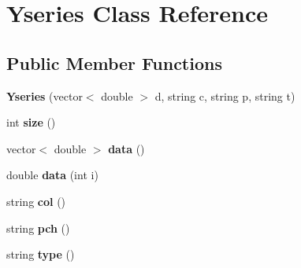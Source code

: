 \hypertarget{classYseries}{}\section{Yseries Class Reference}
\label{classYseries}
\subsection*{Public Member Functions}
\begin{DoxyCompactItemize}
\item 
\hypertarget{classYseries_a9be497f36c55fce41a55da4e01aa9572}{}{\bfseries Yseries} (vector$<$ double $>$ d, string c, string p, string t)\label{classYseries_a9be497f36c55fce41a55da4e01aa9572}

\item 
\hypertarget{classYseries_a5bc0a282eb4db0040de12409703fe586}{}int {\bfseries size} ()\label{classYseries_a5bc0a282eb4db0040de12409703fe586}

\item 
\hypertarget{classYseries_a2868b1ad13eb474d4a02dd949d1eb203}{}vector$<$ double $>$ {\bfseries data} ()\label{classYseries_a2868b1ad13eb474d4a02dd949d1eb203}

\item 
\hypertarget{classYseries_a34767aa102b85ed47738ce525e7963b2}{}double {\bfseries data} (int i)\label{classYseries_a34767aa102b85ed47738ce525e7963b2}

\item 
\hypertarget{classYseries_a7cc70f3ff8ba1bd3e78bae175099ab05}{}string {\bfseries col} ()\label{classYseries_a7cc70f3ff8ba1bd3e78bae175099ab05}

\item 
\hypertarget{classYseries_abf97d4c566049b0cd5d8a9c6fd7a04df}{}string {\bfseries pch} ()\label{classYseries_abf97d4c566049b0cd5d8a9c6fd7a04df}

\item 
\hypertarget{classYseries_a25b60b539632f2b2f88d6f7759b8e946}{}string {\bfseries type} ()\label{classYseries_a25b60b539632f2b2f88d6f7759b8e946}

\end{DoxyCompactItemize}
